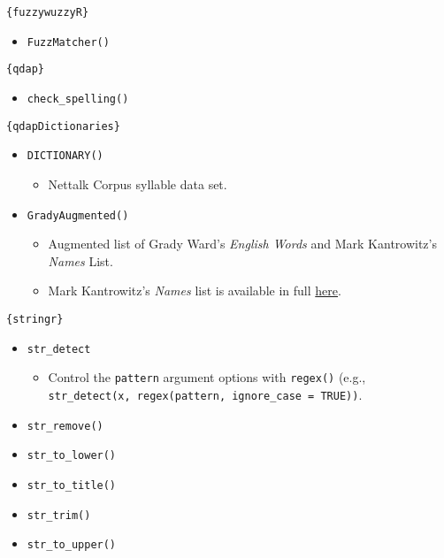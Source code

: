 \documentclass[
]{book}
\providecommand{\tightlist}{%
  \setlength{\itemsep}{0pt}\setlength{\parskip}{0pt}}
\begin{document}
\texttt{\{fuzzywuzzyR\}}

\begin{itemize}
\tightlist
\item
  \texttt{FuzzMatcher()}
\end{itemize}

\texttt{\{qdap\}}

\begin{itemize}
\tightlist
\item
  \texttt{check\_spelling()}
\end{itemize}

\texttt{\{qdapDictionaries\}}

\begin{itemize}
\tightlist
\item
  \texttt{DICTIONARY()}

  \begin{itemize}
  \tightlist
  \item
    Nettalk Corpus syllable data set.
  \end{itemize}
\item
  \texttt{GradyAugmented()}

  \begin{itemize}
  \tightlist
  \item
    Augmented list of Grady Ward's \emph{English Words} and Mark Kantrowitz's \emph{Names} List.
  \item
    Mark Kantrowitz's \emph{Names} list is available in full \href{http://www.cs.cmu.edu/afs/cs/project/ai-repository/ai/areas/nlp/corpora/names/}{here}.
  \end{itemize}
\end{itemize}

\texttt{\{stringr\}}

\begin{itemize}
\tightlist
\item
  \texttt{str\_detect}

  \begin{itemize}
  \tightlist
  \item
    Control the \texttt{pattern} argument options with \texttt{regex()} (e.g., \texttt{str\_detect(x,\ regex(pattern,\ ignore\_case\ =\ TRUE))}.
  \end{itemize}
\item
  \texttt{str\_remove()}
\item
  \texttt{str\_to\_lower()}
\item
  \texttt{str\_to\_title()}
\item
  \texttt{str\_trim()}
\item
  \texttt{str\_to\_upper()}
\end{itemize}
\end{document}
